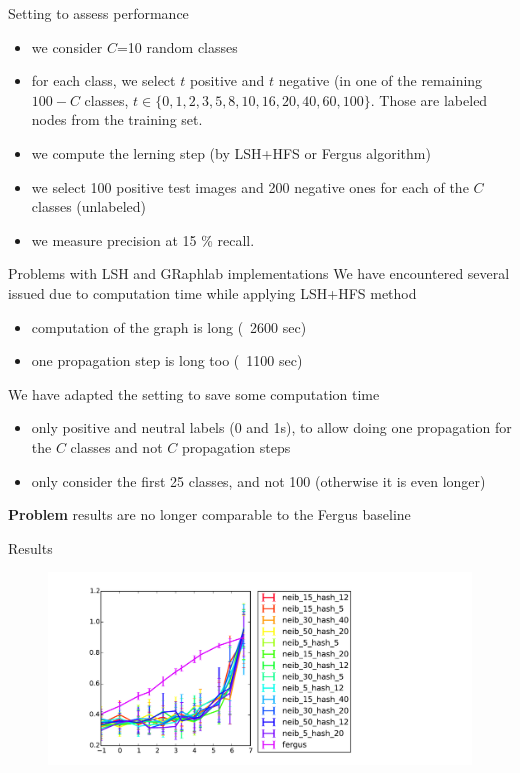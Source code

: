 \documentclass[11pt)]{beamer}
\begin{document}
\begin{frame}{Setting to assess performance}
\begin{itemize}
\item we consider $C$=10 random classes
\item for each class, we select $t$ positive and $t$ negative (in one of the remaining $100-C$ classes, $t\in \{0, 1, 2, 3, 5, 8, 10, 16, 20, 40, 60, 100\}$. Those are labeled nodes from the training set.
\item we compute the lerning step (by LSH+HFS or Fergus algorithm)
\item we select 100 positive test images and 200 negative ones for each of the $C$ classes (unlabeled)
\item we measure precision at 15 \% recall.
\end{itemize}
\end{frame}

\begin{frame}{Problems with LSH and GRaphlab implementations}
We have encountered several issued due to computation time while applying LSH+HFS method
\begin{itemize}
\item computation of the graph is long (~2600 sec)
\item one propagation step is long too (~1100 sec)
\end{itemize}
We have adapted the setting to save some computation time
\begin{itemize}
\item only positive and neutral labels (0 and 1s), to allow doing one propagation for the $C$ classes and not $C$ propagation steps
\item only consider the first 25 classes, and not 100 (otherwise it is even longer)
\end{itemize}

{\color{red}\textbf{Problem} results are no longer comparable to the Fergus baseline}

\end{frame}

\begin{frame}{Results}
\begin{figure}
  \includegraphics[width=\textwidth]{method_comp.pdf}
\end{figure}
\end{frame}
\end{document}
